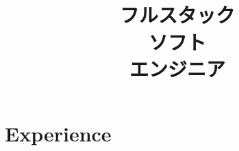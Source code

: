 \documentclass[a4paper,11pt]{cv4tw}%
\title{\\ フルスタック\\ソフト\\エンジニア}
\begin{document}
\section{Experience}
\end{document}
